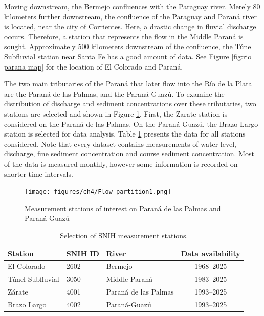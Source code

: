 Moving downstream, the Bermejo confluences with the Paraguay river. Merely 80 kilometers further downstream, the confluence of the Paraguay and Paraná river is located, near the city of Corrientes. Here, a drastic change in fluvial discharge occurs. Therefore, a station that represents the flow in the Middle Paraná is sought. Approximately 500 kilometers downstream of the confluence, the Túnel Subfluvial station near Santa Fe has a good amount of data. See Figure \ref{fig:rio parana map} for the location of El Colorado and Paraná. 

The two main tributaries of the Paraná that later flow into the Río de la Plata are the Paraná de las Palmas, and the Paraná-Guazú. To examine the distribution of discharge and sediment concentrations over these tributaries, two stations are selected and shown in Figure \ref{fig:flow partition}. First, the Zarate station is considered on the Paraná de las Palmas. On the Paraná-Guazú, the Brazo Largo station is selected for data analysis. Table \ref{tab:stations data collection} presents the data for all stations considered. Note that every dataset contains measurements of water level, discharge, fine sediment concentration and course sediment concentration. Most of the data is measured monthly, however some information is recorded on shorter time intervals. 


\begin{figure}
    \centering
    \texttt{[image: figures/ch4/Flow partition1.png]}
    \caption{Measurement stations of interest on Paraná de las Palmas and Paraná-Guazú}
    \label{fig:flow partition}
\end{figure}



\begin{table}[htbp]
    \centering
    \renewcommand{\arraystretch}{1.2} %
    \setlength{\tabcolsep}{8pt}       %
    \begin{tabular}{lllc}
        \toprule
        \textbf{Station} & \textbf{SNIH ID} & \textbf{River} & \textbf{Data availability} \\
        \midrule
        El Colorado         & 2602 & Bermejo               & 1968--2025 \\
        Túnel Subfluvial    & 3050 & Middle Paraná         & 1983--2025 \\
        Zárate              & 4001 & Paraná de las Palmas  & 1993--2025 \\
        Brazo Largo         & 4002 & Paraná-Guazú          & 1993--2025 \\
        \bottomrule
    \end{tabular}
    \caption{Selection of SNIH measurement stations.}
    \label{tab:stations data collection}
\end{table}



